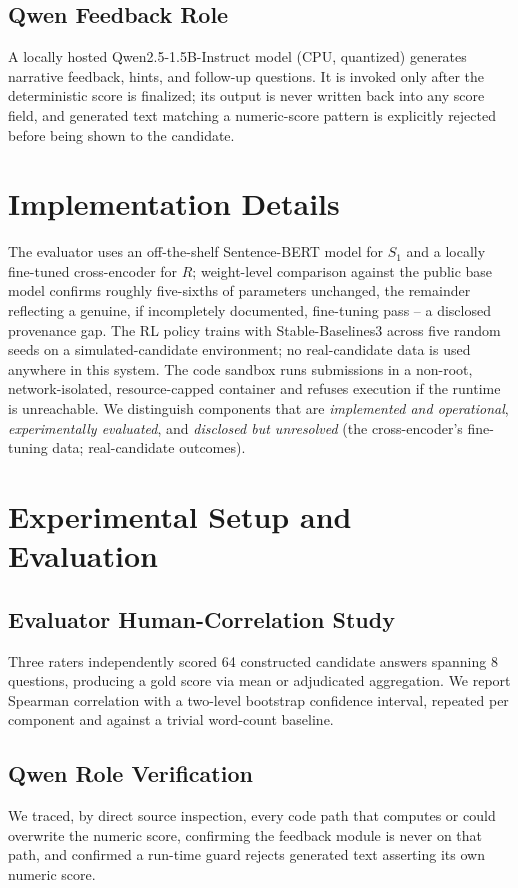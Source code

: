 \documentclass[conference]{IEEEtran}
\begin{document}
\subsection{Qwen Feedback Role}
\label{sec:qwen}

A locally hosted Qwen2.5-1.5B-Instruct model (CPU, quantized) generates narrative feedback, hints, and follow-up questions. It is invoked only after the deterministic score is finalized; its output is never written back into any score field, and generated text matching a numeric-score pattern is explicitly rejected before being shown to the candidate.

\section{Implementation Details}

The evaluator uses an off-the-shelf Sentence-BERT model \cite{reimers2019} for $S_1$ and a locally fine-tuned cross-encoder for $R$; weight-level comparison against the public base model confirms roughly five-sixths of parameters unchanged, the remainder reflecting a genuine, if incompletely documented, fine-tuning pass -- a disclosed provenance gap. The RL policy trains with Stable-Baselines3 across five random seeds on a simulated-candidate environment; no real-candidate data is used anywhere in this system. The code sandbox runs submissions in a non-root, network-isolated, resource-capped container and refuses execution if the runtime is unreachable. We distinguish components that are \emph{implemented and operational}, \emph{experimentally evaluated}, and \emph{disclosed but unresolved} (the cross-encoder's fine-tuning data; real-candidate outcomes).

\section{Experimental Setup and Evaluation}

\subsection{Evaluator Human-Correlation Study}
Three raters independently scored 64 constructed candidate answers spanning 8 questions, producing a gold score via mean or adjudicated aggregation. We report Spearman correlation with a two-level bootstrap confidence interval, repeated per component and against a trivial word-count baseline.

\subsection{Qwen Role Verification}
\label{sec:qwenverif}
We traced, by direct source inspection, every code path that computes or could overwrite the numeric score, confirming the feedback module is never on that path, and confirmed a run-time guard rejects generated text asserting its own numeric score.
\end{document}
